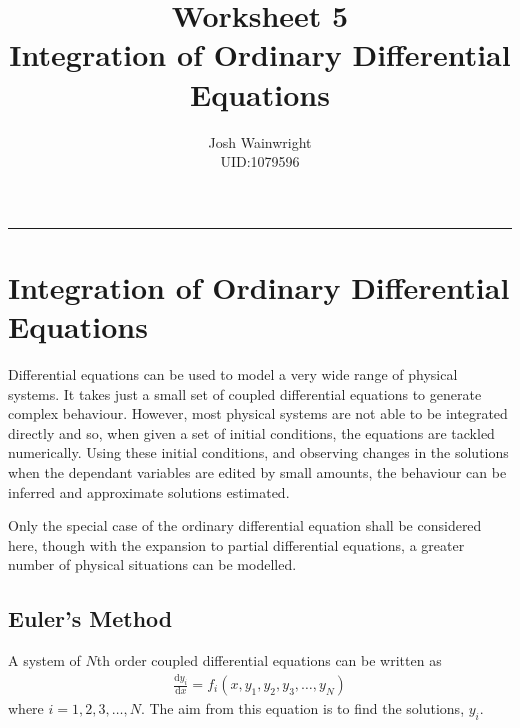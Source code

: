 \documentclass[11pt]{article} %
\author{Josh Wainwright \\ UID:1079596}
\title{Worksheet 5 \\ Integration of Ordinary Differential Equations}
\date{}
\newcommand{\dx}[2]{\frac{\textrm{d} #1}{\textrm{d} #2}} %
\begin{document}
\maketitle
\tableofcontents
\vspace{1cm}\hrule \vspace{1cm}
\setcounter{section}{4}
\section{Integration of Ordinary Differential Equations}
Differential equations can be used to model a very wide range of physical systems. It takes just a small set of coupled differential equations to generate complex behaviour. However, most physical systems are not able to be integrated directly and so, when given a set of initial conditions, the equations are tackled numerically. Using these initial conditions, and observing changes in the solutions when the dependant variables are edited by small amounts, the behaviour can be inferred and approximate solutions estimated. 

Only the special case of the ordinary differential equation shall be considered here, though with the expansion to partial differential equations, a greater number of physical situations can be modelled.

\subsection{Euler's Method}
A system of $N$th order coupled differential equations can be written as 
\begin{align*}
	\dx{y_i}{x} = f_i(x, y_1, y_2, y_3, \ldots, y_N)
\end{align*}
where $i = 1, 2, 3, \ldots, N$. The aim from this equation is to find the solutions, $y_i$.
\end{document}
